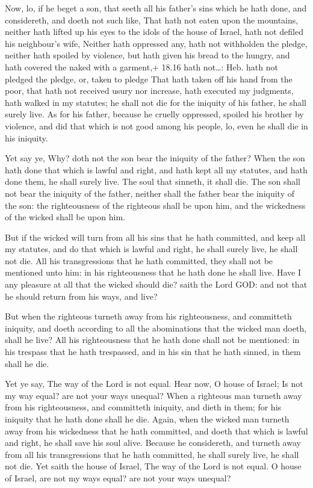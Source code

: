  Now, lo, if he beget a son, that seeth all his father's
sins which he hath done, and considereth, and doeth not such like,
 That hath not eaten upon the mountains, neither hath
lifted up his eyes to the idols of the house of Israel, hath not defiled
his neighbour's wife,  Neither hath oppressed any, hath not
withholden the pledge, neither hath spoiled by violence, but hath given
his bread to the hungry, and hath covered the naked with a garment,+
18.16 hath not\ldots: Heb. hath not pledged the pledge, or, taken to
pledge  That hath taken off his hand from the poor, that
hath not received usury nor increase, hath executed my judgments, hath
walked in my statutes; he shall not die for the iniquity of his father,
he shall surely live.  As for his father, because he
cruelly oppressed, spoiled his brother by violence, and did that which
is not good among his people, lo, even he shall die in his iniquity.

 Yet say ye, Why? doth not the son bear the iniquity of
the father? When the son hath done that which is lawful and right, and
hath kept all my statutes, and hath done them, he shall surely live.
 The soul that sinneth, it shall die. The son shall not
bear the iniquity of the father, neither shall the father bear the
iniquity of the son: the righteousness of the righteous shall be upon
him, and the wickedness of the wicked shall be upon him.

 But if the wicked will turn from all his sins that he hath
committed, and keep all my statutes, and do that which is lawful and
right, he shall surely live, he shall not die.  All his
transgressions that he hath committed, they shall not be mentioned unto
him: in his righteousness that he hath done he shall live. 
Have I any pleasure at all that the wicked should die? saith the Lord
GOD: and not that he should return from his ways, and live?

 But when the righteous turneth away from his
righteousness, and committeth iniquity, and doeth according to all the
abominations that the wicked man doeth, shall he live? All his
righteousness that he hath done shall not be mentioned: in his trespass
that he hath trespassed, and in his sin that he hath sinned, in them
shall he die.

 Yet ye say, The way of the Lord is not equal. Hear now,
O house of Israel; Is not my way equal? are not your ways unequal?
 When a righteous man turneth away from his righteousness,
and committeth iniquity, and dieth in them; for his iniquity that he
hath done shall he die.  Again, when the wicked man turneth
away from his wickedness that he hath committed, and doeth that which is
lawful and right, he shall save his soul alive.  Because he
considereth, and turneth away from all his transgressions that he hath
committed, he shall surely live, he shall not die.  Yet
saith the house of Israel, The way of the Lord is not equal. O house of
Israel, are not my ways equal? are not your ways unequal?


